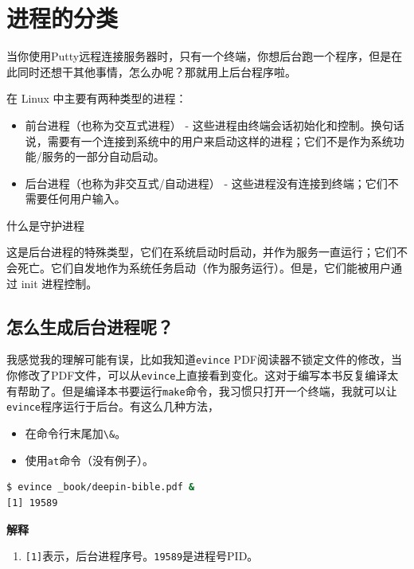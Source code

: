 \documentclass[doctor,openright,twoside]{sjtuthesis}
\providecommand{\tightlist}{%
    \setlength{\itemsep}{0pt}\setlength{\parskip}{0pt}}
\newcommand{\passthrough}[1]{#1}
\theoremstyle{plain}
\theoremstyle{definition}
\theoremstyle{remark}
\theoremstyle{ocrenumbox}
\theoremstyle{plain}
\begin{document}
\section{进程的分类}

当你使用Putty远程连接服务器时，只有一个终端，你想后台跑一个程序，但是在此同时还想干其他事情，怎么办呢？那就用上后台程序啦。

在 Linux 中主要有两种类型的进程：

\begin{itemize}
\tightlist
\item
  前台进程（也称为交互式进程） -
  这些进程由终端会话初始化和控制。换句话说，需要有一个连接到系统中的用户来启动这样的进程；它们不是作为系统功能/服务的一部分自动启动。
\item
  后台进程（也称为非交互式/自动进程） -
  这些进程没有连接到终端；它们不需要任何用户输入。
\end{itemize}

什么是守护进程

这是后台进程的特殊类型，它们在系统启动时启动，并作为服务一直运行；它们不会死亡。它们自发地作为系统任务启动（作为服务运行）。但是，它们能被用户通过
init 进程控制。

\subsection{怎么生成后台进程呢？}

我感觉我的理解可能有误，比如我知道\passthrough{\lstinline!evince!}
PDF阅读器不锁定文件的修改，当你修改了PDF文件，可以从\passthrough{\lstinline!evince!}上直接看到变化。这对于编写本书反复编译太有帮助了。但是编译本书要运行\passthrough{\lstinline!make!}命令，我习惯只打开一个终端，我就可以让\passthrough{\lstinline!evince!}程序运行于后台。有这么几种方法，

\begin{itemize}
\tightlist
\item
  在命令行末尾加\passthrough{\lstinline!\&!}。
\item
  使用\passthrough{\lstinline!at!}命令（没有例子）。
\end{itemize}

\begin{lstlisting}[language=bash]
$ evince _book/deepin-bible.pdf &
[1] 19589
\end{lstlisting}

\textbf{解释}

\begin{enumerate}
\def\labelenumi{\arabic{enumi}.}
\tightlist
\item
  \passthrough{\lstinline![1]!}表示，后台进程序号。\passthrough{\lstinline!19589!}是进程号PID。
\end{enumerate}
\end{document}
